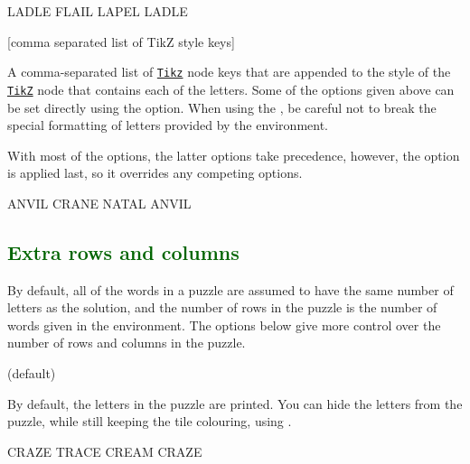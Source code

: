 \documentclass[svgnames]{report}
\newcommand\ctan[1]{\href{https://www.ctan.org/pkg/#1}{\texttt{#1}}}
\newcommand\Section[1]{\subsection{\textcolor{DarkGreen}{#1}}}
\begin{document}
  \begin{example}
  \begin{wordle}[thickness=1mm, borders=red]{LADLE}
     FLAIL
     LAPEL
     LADLE
  \end{wordle}
  \end{example}

  [comma separated list of TikZ style keys]

  A comma-separated list of \ctan{Tikz} node keys that are appended to
  the style of the \ctan{TikZ} node that contains each of the
   letters.  Some of the options given above can be set
  directly using the  option. When using the
  , be careful not to break the special formatting of
  letters provided by the  environment.\par

  With most of the  options, the latter options take
  precedence, however, the  option is applied last,
  so it overrides any competing options.

  \begin{example}
  \begin{wordle}[tile style={rotate=45}]{ANVIL}
    CRANE
    NATAL
    ANVIL
  \end{wordle}
  \end{example}

  \Section{Extra rows and columns}

  By default, all of the words in a  puzzle are assumed
  to have the same number of letters as the solution, and the number of
  rows in the puzzle is the number of words given in the environment. The
  options below give more control over the number of rows and columns in
  the puzzle.

   (default)\qquad

  By default, the letters in the puzzle are printed. You can hide the
  letters from the puzzle, while still keeping the  tile
  colouring, using .

  \begin{example}
  \begin{wordle}[letters]{CRAZE} %
    TRACE
    CREAM
    CRAZE
  \end{wordle}
  \end{example}
\end{document}
